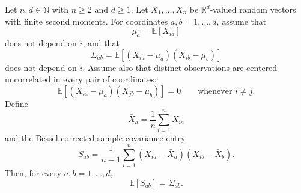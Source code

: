 \begin{theorem}
Let $n,d\in\mathbb{N}$ with $n\ge 2$ and $d\ge 1$. Let
$X_1,\ldots,X_n$ be $\mathbb{R}^d$-valued random vectors with finite second
moments. For coordinates $a,b=1,\ldots,d$, assume that
\[
\mu_a=\mathbb{E}[X_{ia}]
\]
does not depend on $i$, and that
\[
\Sigma_{ab}
=
\mathbb{E}\left[(X_{ia}-\mu_a)(X_{ib}-\mu_b)\right]
\]
does not depend on $i$. Assume also that distinct observations are centered
uncorrelated in every pair of coordinates:
\[
\mathbb{E}\left[(X_{ia}-\mu_a)(X_{jb}-\mu_b)\right]=0
\qquad
\text{whenever }i\ne j.
\]
Define
\[
\bar X_a=\frac{1}{n}\sum_{i=1}^n X_{ia}
\]
and the Bessel-corrected sample covariance entry
\[
S_{ab}
=
\frac{1}{n-1}
\sum_{i=1}^n
(X_{ia}-\bar X_a)(X_{ib}-\bar X_b).
\]
Then, for every $a,b=1,\ldots,d$,
\[
\mathbb{E}[S_{ab}]=\Sigma_{ab}.
\]
\end{theorem}
